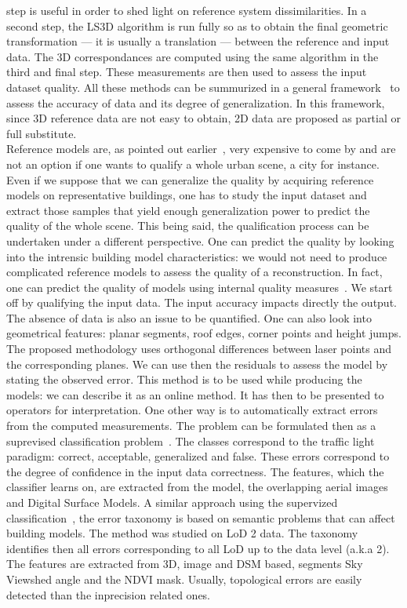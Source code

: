\documentclass[../main.tex]{subfiles}
\begin{document}
step is useful in order to shed light on reference system dissimilarities. In a second step, the LS3D algorithm is run fully so as to obtain the final geometric transformation --- it is usually a translation --- between the reference and input data. The 3D correspondances are computed using the same algorithm in the third and final step. These measurements are then used to assess the input dataset quality. All these methods can be summurized in a general framework~\cite{Schuster2003} to assess the accuracy of data and its degree of generalization. In this framework, since 3D reference data are not easy to obtain, 2D data are proposed as partial or full substitute.\\

    Reference models are, as pointed out earlier~\cite{Schuster2003}, very expensive to come by and are not an option if one wants to qualify a whole urban scene, a city for instance. Even if we suppose that we can generalize the quality by acquiring reference models on representative buildings, one has to study the input dataset and extract those samples that yield enough generalization power to predict the quality of the whole scene. This being said, the qualification process can be undertaken under a different perspective. One can predict the quality by looking into the intrensic building model characteristics: we would not need to produce complicated reference models to assess the quality of a reconstruction. In fact, one can predict the quality of models using internal quality measures~\cite{OudeElberink2010}. We start off by qualifying the input data. The input accuracy impacts directly the output. The absence of data is also an issue to be quantified. One can also look into geometrical features: planar segments, roof edges, corner points and height jumps. The proposed methodology uses orthogonal differences between laser points and the corresponding planes. We can use then the residuals to assess the model by stating the observed error. This method is to be used while producing the models: we can describe it as an online method. It has then to be presented to operators for interpretation. One other way is to automatically extract errors from the computed measurements. The problem can be formulated then as a suprevised classification problem~\cite{Boudet2006}. The classes correspond to the traffic light paradigm: correct, acceptable, generalized and false. These errors correspond to the degree of confidence in the input data correctness. The features, which the classifier learns on, are extracted from the model, the overlapping aerial images and Digital Surface Models. A similar approach using the supervized classification~\cite{michelin2013quality}, the error taxonomy is based on semantic problems that can affect building models. The method was studied on LoD 2 data. The taxonomy identifies then all errors corresponding to all LoD up to the data level (a.k.a 2). The features are extracted from 3D, image and DSM based, segments Sky Viewshed angle and the NDVI mask. Usually, topological errors are easily detected than the inprecision related ones.\\
\end{document}
